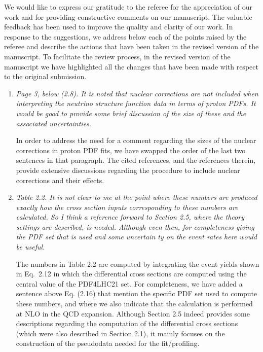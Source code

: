 \documentclass[11pt,a4paper]{article}
\begin{document}
	
\noindent
We would like to express our gratitude to the referee for the appreciation
of our work and for providing constructive
comments on our manuscript. The valuable feedback has been used to
improve the quality and clarity of our work.
%
In response to the suggestions, we address below each of the points raised by 
the referee and describe the actions that have been taken
in the revised version of the manuscript.
%
To facilitate the review process, in the revised version of the manuscript
we have highlighted all the changes that have been made with respect to the original
submission.

\noindent

\begin{enumerate}
	\item {\it Page 3, below (2.8). It is noted that nuclear corrections are not included when 
		interpreting the neutrino structure function data in terms of proton PDFs. It would be good
		to provide some brief discussion of the size of these and the associated uncertainties.
	}
	
	In order to address the need for a comment regarding the sizes of the nuclear corrections
	in proton PDF fits, we have swapped the order of the last two sentences in that paragraph.
	The cited references, and the references therein, provide extensive discussions regarding
	the procedure to include nuclear corrections and their effects.
	
	\item {\it Table 2.2. It is not clear to me at the point where these numbers are produced exactly
		how the cross section inputs corresponding to these numbers are calculated. So I
		think a reference forward to Section 2.5, where the theory settings are described, is
		needed. Although even then, for completeness giving the PDF set that is used and
		some uncertain
		ty on the event rates here would be useful.
	}
	
	The numbers in Table 2.2 are computed by integrating the event yields shown in Eq.~2.12 in
	which the differential cross sections are computed using the central value of the PDF4LHC21
	set. For completeness, we have added a sentence above Eq. (2.16) that mention the specific
	PDF set used to compute these numbers, and where we also indicate that the calculation
        is performed at NLO in the QCD expansion.
        Although
	Section 2.5 indeed provides some descriptions regarding the computation of the differential cross sections
	(which were also described in Section 2.1), it mainly focuses on the construction of the pseudodata
	needed for the fit/profiling.


\end{enumerate}
\end{document}
